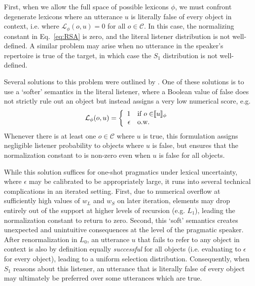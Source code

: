 \documentclass[11pt, floatsintext]{apa6}
\newcommand{\den}[1]{\ensuremath{\llbracket #1 \rrbracket}}
\begin{document}
First, when we allow the full space of possible lexicons $\phi$, we must confront degenerate lexicons where an utterance $u$ is literally false of every object in context, i.e. where $\mathcal{L}_\phi(o, u) = 0$ for all $o\in \mathcal{C}$. 
In this case, the normalizing constant in Eq.~\ref{eq:RSA} is zero, and the literal listener distribution is not well-defined.
A similar problem may arise when no utterance in the speaker's repertoire is true of the target, in which case the $S_1$ distribution is not well-defined.

Several solutions to this problem were outlined by .
One of these solutions is to use a `softer' semantics in the literal listener, where a Boolean value of false does not strictly rule out an object but instead assigns a very low numerical score, e.g. 
$$\mathcal{L}_\phi(o,u) = \left\{ \begin{array} {rl} 1 & \textrm{if $o \in $\den{u}$_\phi$} \\ \epsilon & \textrm{o.w.} \end{array}\right.$$
Whenever there is at least one $o\in\mathcal{C}$ where $u$ is true, this formulation assigns negligible listener probability to objects where $u$ is false, but ensures that the normalization constant to is non-zero even when $u$ is false for all objects.

While this solution suffices for one-shot pragmatics under lexical uncertainty, where $\epsilon$ may be calibrated to be appropriately large, it runs into several technical complications in an iterated setting.
First, due to numerical overflow at sufficiently high values of $w_L$ and $w_S$ on later iteration, elements may drop entirely out of the support at higher levels of recursion (e.g. $L_1$), leading the normalization constant to return to zero. 
Second, this `soft' semantics creates unexpected and unintuitive consequences at the level of the pragmatic speaker. 
After renormalization in $L_0$, an utterance $u$ that fails to refer to any object in context is also by definition equally \emph{successful} for all objects (i.e. evaluating to $\epsilon$ for every object), leading to a uniform selection distribution.
Consequently, when $S_1$ reasons about this listener, an utterance that is literally false of every object may ultimately be preferred over some utterances which are true.
\end{document}
